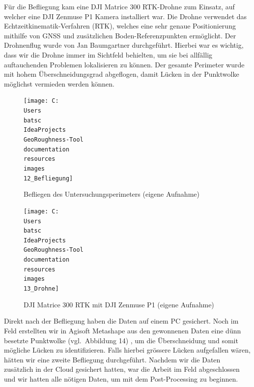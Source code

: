 \documentclass[12pt]{article}
\begin{document}
        Für die Befliegung kam eine DJI Matrice 300 RTK-Drohne zum Einsatz, auf welcher eine DJI Zenmuse P1 Kamera installiert war.
        Die Drohne verwendet das Echtzeitkinematik-Verfahren (RTK), welches eine sehr genaue Positionierung mithilfe von GNSS und zusätzlichen Boden-Referenzpunkten ermöglicht.
        Der Drohnenflug wurde von Jan Baumgartner durchgeführt.
        Hierbei war es wichtig, dass wir die Drohne immer im Sichtfeld behielten, um sie bei allfällig auftauchenden Problemen lokalisieren zu können.
        Der gesamte Perimeter wurde mit hohem Überschneidungsgrad abgeflogen, damit Lücken in der Punktwolke möglichst vermieden werden können.

        \begin{minipage}{.45\textwidth}
            \begin{figure}
                \centering
                \texttt{[image: C:\\Users\\batsc\\IdeaProjects\\GeoRoughness-Tool\\documentation\\resources\\images\\12\_Befliegung]}
                \caption{Befliegen des Untersuchungsperimeters (eigene Aufnahme)}
                \label{fig:12_befliegung}
            \end{figure}
        \end{minipage}
        \hfill
        \begin{minipage}{.45\textwidth}
            \begin{figure}
                \centering
                \texttt{[image: C:\\Users\\batsc\\IdeaProjects\\GeoRoughness-Tool\\documentation\\resources\\images\\13\_Drohne]}
                \caption{DJI Matrice 300 RTK mit DJI Zenmuse P1 (eigene Aufnahme)}
                \label{fig:13_drohne}
            \end{figure}
        \end{minipage}

        Direkt nach der Befliegung haben die Daten auf einem PC gesichert.
        Noch im Feld erstellten wir in Agisoft Metashape aus den gewonnenen Daten eine dünn besetzte Punktwolke (vgl.\ Abbildung 14) , um die Überschneidung und somit mögliche Lücken zu identifizieren.
        Falls hierbei grössere Lücken aufgefallen wären, hätten wir eine zweite Befliegung durchgeführt.
        Nachdem wir die Daten zusätzlich in der Cloud gesichert hatten, war die Arbeit im Feld abgeschlossen und wir hatten alle nötigen Daten, um mit dem Post-Processing zu beginnen.
\end{document}
